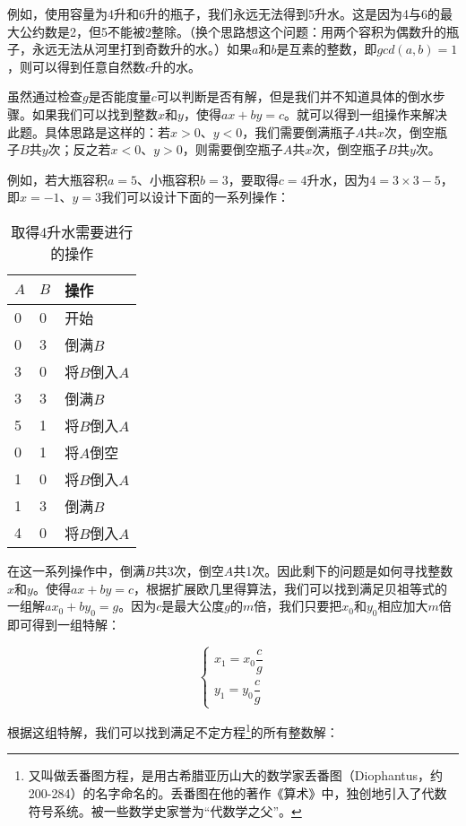\documentclass{article}
\begin{document}
例如，使用容量为4升和6升的瓶子，我们永远无法得到5升水。这是因为4与6的最大公约数是2，但5不能被2整除。（换个思路想这个问题：用两个容积为偶数升的瓶子，永远无法从河里打到奇数升的水。）如果$a$和$b$是互素的整数，即$gcd(a, b) = 1$，则可以得到任意自然数$c$升的水。

虽然通过检查$g$是否能度量$c$可以判断是否有解，但是我们并不知道具体的倒水步骤。如果我们可以找到整数$x$和$y$，使得$ax + by = c$。就可以得到一组操作来解决此题。具体思路是这样的：若$x > 0$、$y < 0$，我们需要倒满瓶子$A$共$x$次，倒空瓶子$B$共$y$次；反之若$x < 0$、$y > 0$，则需要倒空瓶子$A$共$x$次，倒空瓶子$B$共$y$次。

例如，若大瓶容积$a=5$、小瓶容积$b=3$，要取得$c=4$升水，因为$4 = 3 \times 3 - 5$，即$x = -1$、$y = 3$我们可以设计下面的一系列操作：

\begin{table}[htbp]
\centering
\begin{tabular}{l|l|l}
$A$ & $B$ & 操作 \\
\hline
0 & 0 & 开始 \\
0 & 3 & 倒满$B$ \\
3 & 0 & 将$B$倒入$A$ \\
3 & 3 & 倒满$B$ \\
5 & 1 & 将$B$倒入$A$ \\
0 & 1 & 将$A$倒空 \\
1 & 0 & 将$B$倒入$A$ \\
1 & 3 & 倒满$B$ \\
4 & 0 & 将$B$倒入$A$ \\
\end{tabular}
\caption{取得4升水需要进行的操作} \label{tab:designed-jugs-ops}
\end{table}

在这一系列操作中，倒满$B$共3次，倒空$A$共1次。因此剩下的问题是如何寻找整数$x$和$y$。使得$ax + by = c$，根据扩展欧几里得算法，我们可以找到满足贝祖等式的一组解$ax_0 + by_0 = g$。因为$c$是最大公度$g$的$m$倍，我们只要把$x_0$和$y_0$相应加大$m$倍即可得到一组特解：

\[
\begin{cases}
  x_1 = x_0 \dfrac{c}{g} \\[2ex]
  y_1 = y_0 \dfrac{c}{g}
\end{cases}
\]

根据这组特解，我们可以找到满足不定方程\footnote{又叫做丢番图方程，是用古希腊亚历山大的数学家丢番图（Diophantus，约200-284）的名字命名的。丢番图在他的著作《算术》中，独创地引入了代数符号系统。被一些数学史家誉为“代数学之父”\cite{HanXueTao2009}。}的所有整数解：
\end{document}
